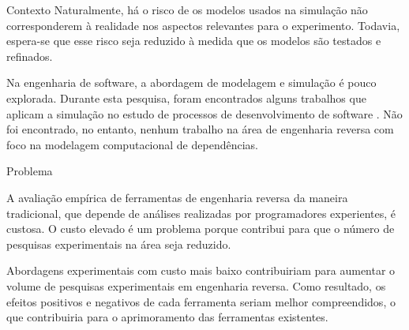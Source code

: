 \begin{section}{Contexto}
		Naturalmente, há o risco de os modelos usados na simulação não corresponderem à realidade nos aspectos relevantes para o experimento. Todavia, espera-se que esse risco seja reduzido à medida que os modelos são testados e refinados.

		Na engenharia de software, a abordagem de modelagem e simulação é pouco explorada. Durante esta pesquisa, foram encontrados alguns trabalhos que aplicam a simulação no estudo de processos de desenvolvimento de software \cite{Stopford2008}. Não foi encontrado, no entanto, nenhum trabalho na área de engenharia reversa com foco na modelagem computacional de dependências.
		
\end{section}

\begin{section}{Problema}
	
	A avaliação empírica de ferramentas de engenharia reversa da maneira tradicional, que depende de análises realizadas por programadores experientes, é custosa. O custo elevado é um problema porque contribui para que o número de pesquisas experimentais na área seja reduzido. 
	
  Abordagens experimentais com custo mais baixo contribuiriam para aumentar o volume de pesquisas experimentais em engenharia reversa. Como resultado, os efeitos positivos e negativos de cada ferramenta seriam melhor compreendidos, o que contribuiria para o aprimoramento das ferramentas existentes.
	
	
\end{section}

